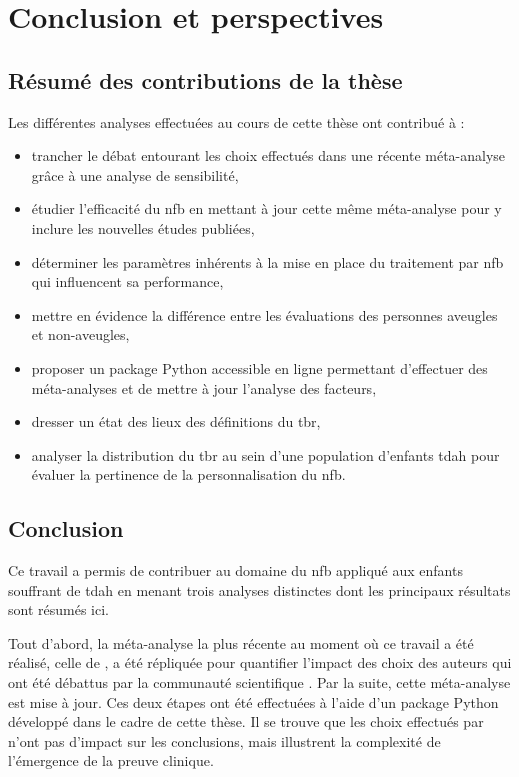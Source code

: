 \chapter{Conclusion et perspectives} \label{chapitre-5}

\section{Résumé des contributions de la thèse}

Les différentes analyses effectuées au cours de cette thèse ont contribué à :
\begin{itemize}
\item trancher le débat entourant les choix effectués dans une récente méta-analyse grâce à une analyse de sensibilité,
\item étudier l'efficacité du \gls{nfb} en mettant à jour cette même méta-analyse pour y inclure les nouvelles études publiées,
\item déterminer les paramètres inhérents à la mise en place du traitement par \gls{nfb} qui influencent sa performance,
\item mettre en évidence la différence entre les évaluations des personnes aveugles et non-aveugles,
\item proposer un package Python accessible en ligne permettant d'effectuer des méta-analyses et de mettre à jour l'analyse des facteurs,
\item dresser un état des lieux des définitions du \gls{tbr},
\item analyser la distribution du \gls{tbr} au sein d'une population d'enfants \gls{tdah} pour évaluer la pertinence 
de la personnalisation du \gls{nfb}.
\end{itemize}

\section{Conclusion}

Ce travail a permis de contribuer au domaine du \gls{nfb} appliqué aux enfants souffrant de \gls{tdah} en menant trois analyses 
distinctes dont les principaux résultats sont résumés ici. 

Tout d'abord, la méta-analyse la plus récente au moment où ce travail a été réalisé, celle de \citet{Cortese2016}, a été répliquée 
pour quantifier l'impact des choix des auteurs qui ont été débattus par la communauté scientifique \citep{Micoulaud2016}. Par la suite, cette méta-analyse est 
mise à jour. Ces deux étapes ont été effectuées à l'aide d'un package Python développé 
dans le cadre de cette thèse. Il se trouve que les choix effectués par \citet{Cortese2016} n'ont pas d'impact sur les conclusions, 
mais illustrent la complexité de l'émergence de la preuve clinique.


